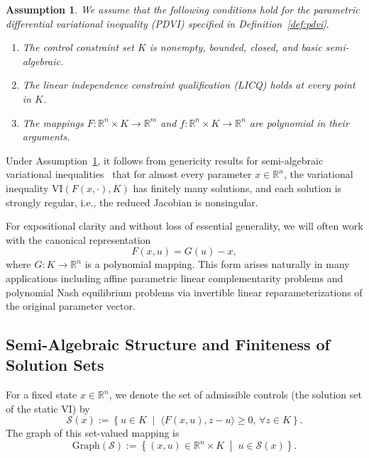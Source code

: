 \documentclass[sn-basic,Numbered]{sn-jnl}
\theoremstyle{thmstyleone}%
\newtheorem{assumption}{Assumption}
\begin{document}
\begin{assumption} \label{ass:core}
We assume that the following conditions hold for the parametric differential variational inequality (PDVI) specified in Definition~\ref{def:pdvi}.
\begin{enumerate}[label=\textup{(A\arabic*)}, widest=(A3), left=0pt, align=left]
    \item The control constraint set $K$ is nonempty, bounded, closed, and basic semi-algebraic.

    \item The linear independence constraint qualification (LICQ) holds at every point in $K$.

    \item The mappings $F \colon \mathbb{R}^n \times K \to \mathbb{R}^m$ and $f \colon \mathbb{R}^n \times K \to \mathbb{R}^n$ are polynomial in their arguments.
\end{enumerate}
\end{assumption}

Under Assumption~\ref{ass:core}, it follows from genericity results for semi-algebraic variational inequalities~\cite{Hieu2020,Lee2018} that for almost every parameter $x \in \mathbb{R}^n$, the variational inequality $\mathrm{VI}(F(x,\cdot), K)$ has finitely many solutions, and each solution is strongly regular, i.e., the reduced Jacobian is nonsingular.

For expositional clarity and without loss of essential generality, we will often work with the canonical representation
\[ F(x, u) = G(u) - x, \]
where $G : K \to \mathbb{R}^n$ is a polynomial mapping. This form arises naturally in many applications including affine parametric linear complementarity problems and polynomial Nash equilibrium problems via invertible linear reparameterizations of the original parameter vector.

\subsection{Semi-Algebraic Structure and Finiteness of Solution Sets}
For a fixed state $x \in \mathbb{R}^n$, we denote the set of admissible controls (the solution set of the static VI) by
\[ \mathcal{S}(x) := \left\{ u \in K \;\middle|\; \langle F(x, u), z - u \rangle \geq 0,\, \forall z \in K \right\}. \]
The graph of this set-valued mapping is
\[ \mathrm{Graph}(\mathcal{S}) := \left\{ (x, u) \in \mathbb{R}^{n} \times K \;\middle|\; u \in \mathcal{S}(x) \right\}. \]
\end{document}
